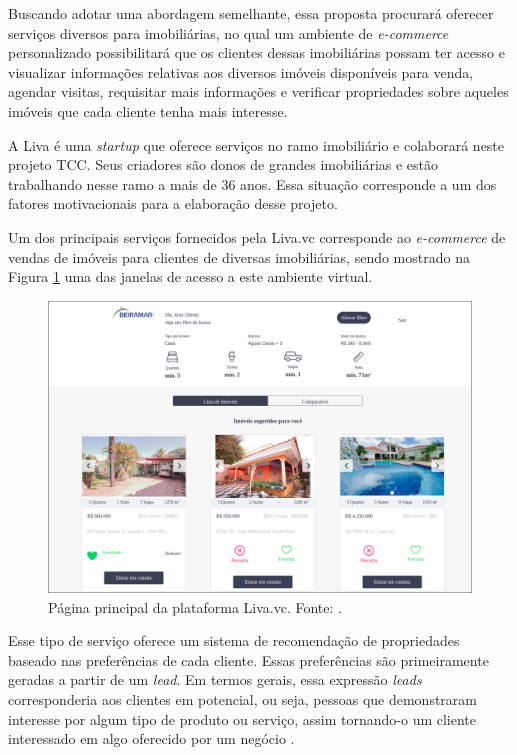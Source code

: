 Buscando adotar uma abordagem semelhante, essa proposta procurará oferecer serviços diversos para imobiliárias, no qual um ambiente de \textit{e-commerce} personalizado possibilitará que os clientes dessas imobiliárias possam ter acesso e visualizar informações relativas aos diversos imóveis disponíveis para venda, agendar visitas, requisitar mais informações e verificar propriedades sobre aqueles imóveis que cada cliente tenha mais interesse.

A Liva é uma \textit{startup} que oferece serviços no ramo imobiliário e colaborará neste projeto TCC. Seus criadores são donos de grandes imobiliárias e estão trabalhando nesse ramo a mais de 36 anos. Essa situação corresponde a um dos fatores motivacionais para a elaboração desse projeto.

Um dos principais serviços fornecidos pela Liva.vc corresponde ao \textit{e-commerce} de vendas de imóveis para clientes de diversas imobiliárias, sendo mostrado na Figura \ref{fig:pagina_principal_liva} uma das janelas de acesso a este ambiente virtual.

\begin{figure}[H]
    \centering
    \includegraphics[scale=0.3]{figuras/introducao/pagina_principal_liva.png}
    \caption[Página principal da plataforma Liva.vc]{Página principal da plataforma Liva.vc. Fonte: \cite{Liva:2019}.}
    \label{fig:pagina_principal_liva}
\end{figure}


Esse tipo de serviço oferece um sistema de recomendação de propriedades baseado nas preferências de cada cliente. Essas preferências são primeiramente geradas a partir de um \textit{lead}. Em termos gerais, essa expressão \textit{leads} corresponderia aos clientes em potencial, ou seja, pessoas que demonstraram interesse por algum tipo de produto ou serviço, assim tornando-o um cliente interessado em algo oferecido por um negócio \cite{Agenciakaizen:2019}.


